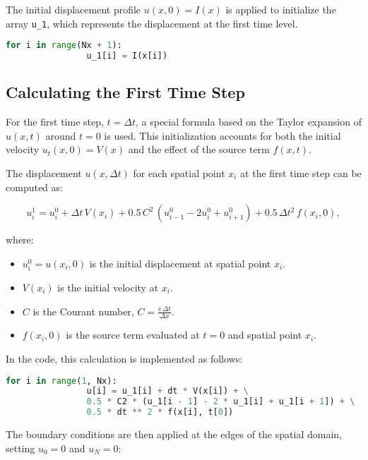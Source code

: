 \documentclass{article}
\begin{document}
		The initial displacement profile $u(x, 0) = I(x)$ is applied to initialize the array \texttt{u\_1}, which represents the displacement at the first time level.
		
		\begin{lstlisting}[language=Python, caption=Applying Initial Condition at t = 0]
			for i in range(Nx + 1):
				u_1[i] = I(x[i])
		\end{lstlisting}
		
		\subsection{Calculating the First Time Step}
		
		For the first time step, $t = \Delta t$, a special formula based on the Taylor expansion of $u(x, t)$ around $t = 0$ is used. This initialization accounts for both the initial velocity $u_t(x, 0) = V(x)$ and the effect of the source term $f(x, t)$.
		
		The displacement $u(x, \Delta t)$ for each spatial point $x_i$ at the first time step can be computed as:
		
		\begin{equation}
			u_i^1 = u_i^0 + \Delta t \, V(x_i) + 0.5 \, C^2 \, \left( u_{i-1}^0 - 2u_i^0 + u_{i+1}^0 \right) + 0.5 \, \Delta t^2 \, f(x_i, 0),
		\end{equation}
		
		where:
		\begin{itemize}
			\item $u_i^0 = u(x_i, 0)$ is the initial displacement at spatial point $x_i$.
			\item $V(x_i)$ is the initial velocity at $x_i$.
			\item $C$ is the Courant number, $C = \frac{c \, \Delta t}{\Delta x}$.
			\item $f(x_i, 0)$ is the source term evaluated at $t = 0$ and spatial point $x_i$.
		\end{itemize}
		
		In the code, this calculation is implemented as follows:
		
		\begin{lstlisting}[language=Python, caption=First Time Step Calculation]
			for i in range(1, Nx):
				u[i] = u_1[i] + dt * V(x[i]) + \
				0.5 * C2 * (u_1[i - 1] - 2 * u_1[i] + u_1[i + 1]) + \
				0.5 * dt ** 2 * f(x[i], t[0])
		\end{lstlisting}
		
		The boundary conditions are then applied at the edges of the spatial domain, setting $u_0 = 0$ and $u_N = 0$:
		
\end{document}
